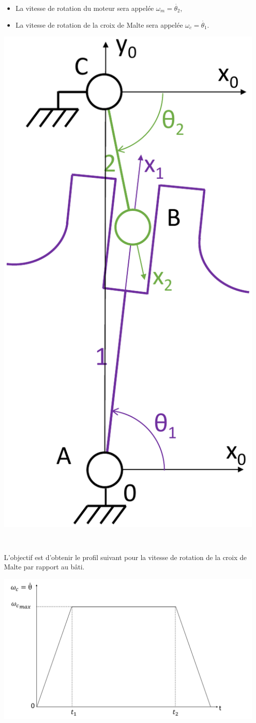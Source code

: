 \begin{itemize}
 \item La vitesse de rotation du moteur sera appelée $\omega_m=\dot{\theta_2}$,
 \item La vitesse de rotation de la croix de Malte sera appelée $\omega_c=\dot{\theta_1}$.
\end{itemize}

\begin{center}
 \includegraphics[width=0.3\linewidth]{img/Capsuleuse_cinematique}
\end{center}


~\

L'objectif est d'obtenir le profil suivant pour la vitesse de rotation de la croix de Malte par rapport au bâti.

\begin{center}
 \includegraphics[width=0.6\linewidth]{img/Capsuleuse_profil}
\end{center}


